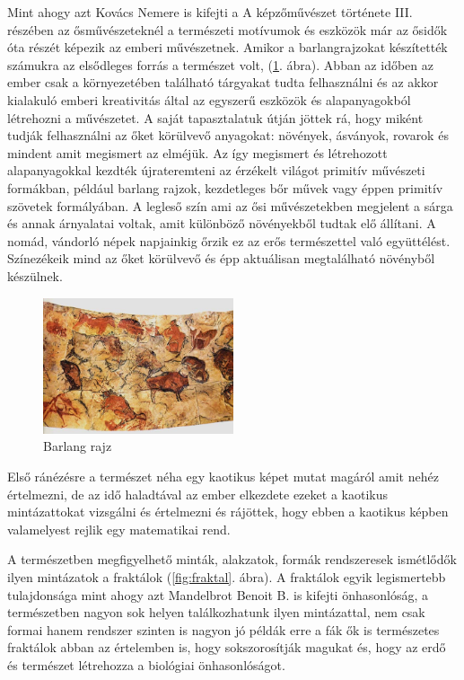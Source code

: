 \documentclass[fontsize=12pt, appendixprefix=true]{scrreprt}
\begin{document}
Mint ahogy azt Kovács Nemere is kifejti a A képzőművészet története III. részében az ősművészeteknél \cite{nemerekepzHomHuveszet} a természeti motívumok és eszközök már az ősidők óta részét képezik az emberi művészetnek. Amikor a barlangrajzokat készítették számukra az elsődleges forrás a természet volt, (\ref{fig:osi}. ábra).
Abban az időben az ember csak a környezetében található tárgyakat tudta felhasználni és az akkor kialakuló emberi kreativitás által az egyszerű eszközök és alapanyagokból létrehozni a művészetet. A saját tapasztalatuk útján jöttek rá, hogy miként tudják felhasználni az őket körülvevő anyagokat: növények, ásványok, rovarok és mindent amit megismert az elméjük. Az így megismert és létrehozott alapanyagokkal kezdték újrateremteni az érzékelt világot primitív művészeti formákban, például barlang rajzok, kezdetleges bőr művek vagy éppen primitív szövetek formályában. A legleső szín ami az ősi művészetekben megjelent a sárga és annak árnyalatai voltak, amit különböző növényekből tudtak elő állítani.
A nomád, vándorló népek napjainkig őrzik ez az erős természettel való együttélést. Színezékeik mind az őket körülvevő és épp aktuálisan megtalálható növényből készülnek.

\begin{figure}[h!]
	\centering
	\includegraphics[width=0.5\textwidth]{img/osi.jpg}
	\caption{Barlang rajz}
	\label{fig:osi}
\end{figure}

Első ránézésre a természet néha egy kaotikus képet mutat magáról amit nehéz értelmezni, de az idő haladtával az ember elkezdete ezeket a kaotikus mintázattokat vizsgálni és értelmezni és rájöttek, hogy ebben a kaotikus képben valamelyest rejlik egy matematikai rend.

A természetben megfigyelhető minták, alakzatok, formák rendszeresek ismétlődők ilyen mintázatok a fraktálok (\ref{fig:fraktal}. ábra). A fraktálok egyik legismertebb tulajdonsága mint ahogy azt Mandelbrot Benoit B. is kifejti \cite{mandelbrot1982fractal} önhasonlóság, a természetben nagyon sok helyen találkozhatunk ilyen mintázattal, nem csak formai hanem rendszer szinten is nagyon jó példák erre a fák ők is természetes fraktálok abban az értelemben is, hogy sokszorosítják magukat és, hogy az erdő és természet létrehozza a biológiai önhasonlóságot. 
\end{document}
